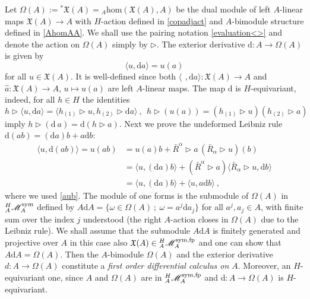 \documentclass[12pt]{article}
\numberwithin{equation}{section}
\theoremstyle{plain}
\theoremstyle{definition}
\theoremstyle{remark}
\def\Vect{\mathfrak{X}}
\def\VV{\Vect(A)}
\def\dd{\mathrm{d}}
\def\MMM{\mathscr{M}}
\def\ra{\triangleright}
\def\RA{\ra}
\def\le{\langle}
\def\re{\rangle}
\def\le{\langle}
\def\re{\rangle}
\def\AA{A}
\def\dd{{\nabla}}
\def\sym{{\rm{sym}}}
\def\oR{\bar R}
\def\al{\alpha}
\def\dd{\mathrm{d}}
\def\cat{{{}^H_\AA\MMM_\AA^\sym}}
\def\catfp{{{}^H_\AA\MMM_\AA^{\sym, \rm{fp}}}}
\def\hom{\mathrm{hom}}
\def\hxi{h}
\begin{document}
Let ${\Omega}(A):={}^*\Vect(A)={}_\AA\hom(\Vect(A),
A)$ be the  dual module of left $A$-linear maps $\Vect(A)\to  A$
with $H$-action  defined in \eqref{copadjact} and
$A$-bimodule structure defined in \eqref{AhomAA}. We shall use the
pairing notation \eqref{evaluation<>} and denote the  action on $\Omega(A)$ simply by $\RA$. 
The exterior derivative  $\dd: A\to {\Omega}(A)$  is given by 
\begin{equation}\label{defofd}
  \langle u, \dd a\rangle=u(a)
  \end{equation}
 for all $u\in \Vect(A)$. It is well-defined since  both  $\le\,~,\dd a\re:\Vect(A)\to A$
and $\hat a: \Vect(A)\to A$, $u
\mapsto u(a)$ are left $A$-linear maps. The map
$\dd$ is $H$-equivariant, indeed, for all
$\hxi\in H$ the identities $$\hxi\ra\le u,\dd a\re= \le\hxi_{(1)}\ra u,\hxi_{(2)}\ra \dd
a\re~,~~\hxi\ra (u(a))=(\hxi_{(1)}\ra
u)(\hxi_{(2)}\ra a)
$$
imply $\hxi\ra (\dd\:\!a)=\dd(\hxi\ra a)$.
Next we prove the undeformed Leibniz rule $\dd(ab)=(\dd a)b+a\dd b$:
\begin{align*}\le u,\dd (ab)\re =u(ab)&=u(a)b+\oR^\al\ra a\,(\oR_\al \ra
  u)(b)\\ & =\le u,(\dd a)b\re+(\oR^\al\ra a)\le\oR_\al\ra u,\dd b\re
  \\
                                &=\le u,(\dd a)b\re+\le u , a\dd b\re~,
\end{align*}
where we used \eqref{aub}.
The module of one forms is the submodule of
${\Omega}(A)$ in $\cat$ defined by
$
A\dd A=\{\omega\in {\Omega}(A)~;~\omega=a^j \dd a_j\}
$
for all $a^j,a_j\in A$, with finite sum over the index $j$ understood
(the right $A$-action closes in $\Omega(A)$ due to the Leibniz rule).  
We shall assume that the submodule $A\dd A$  is finitely generated and
projective over $A$ in this case also $\VV\in \catfp$ and one can show that $A\dd
A=\Omega(A)$. Then the $A$-bimodule $\Omega(A)$ and the
exterior derivative $d:A\to \Omega(A)$ constitute a
{\it first order differential
calculus on $A$}. Moreover, an
$H$-equivariant one, since $A$ and $\Omega(A)$ are
in $\catfp$ and $\dd: A\to \Omega(A)$ is $H$-equivariant.
\\
\end{document}
